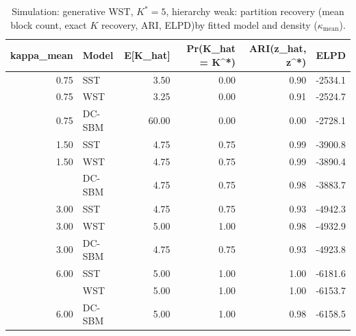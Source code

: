 \begin{table}
\centering
\caption{Simulation: generative WST, $K^*=5$, hierarchy weak: partition recovery (mean block count, exact $K$ recovery, ARI, ELPD)by fitted model and density ($\kappa_{\text{mean}}$).}
\centering
\begin{tabular}[t]{rlrrrr}
\toprule
kappa_mean & Model & E[K_hat] & Pr(K_hat = K^*) & ARI(z_hat, z^*) & ELPD\\
\midrule
0.75 & SST & 3.50 & 0.00 & 0.90 & -2534.1\\
0.75 & WST & 3.25 & 0.00 & 0.91 & -2524.7\\
0.75 & DC-SBM & 60.00 & 0.00 & 0.00 & -2728.1\\
1.50 & SST & 4.75 & 0.75 & 0.99 & -3900.8\\
1.50 & WST & 4.75 & 0.75 & 0.99 & -3890.4\\
\addlinespace
1.50 & DC-SBM & 4.75 & 0.75 & 0.98 & -3883.7\\
3.00 & SST & 4.75 & 0.75 & 0.93 & -4942.3\\
3.00 & WST & 5.00 & 1.00 & 0.98 & -4932.9\\
3.00 & DC-SBM & 4.75 & 0.75 & 0.93 & -4923.8\\
6.00 & SST & 5.00 & 1.00 & 1.00 & -6181.6\\
\addlinespace
6.00 & WST & 5.00 & 1.00 & 1.00 & -6153.7\\
6.00 & DC-SBM & 5.00 & 1.00 & 0.98 & -6158.5\\
\bottomrule
\end{tabular}
\end{table}
